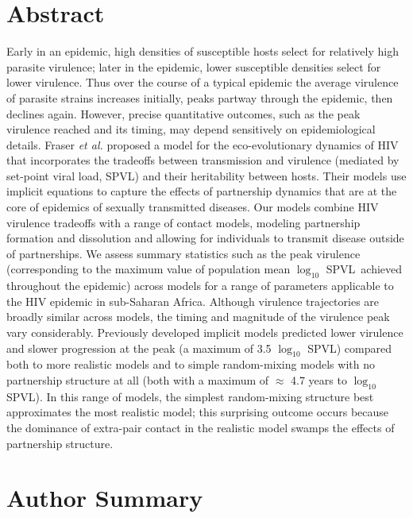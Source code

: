\documentclass[10pt,letterpaper]{article}
\newcommand{\Lspvl}{$\log_{10}$ SPVL}
\begin{document}
\section*{Abstract}
Early in an epidemic, high densities of susceptible hosts
select for relatively high parasite virulence; later in the epidemic,
lower susceptible densities select for lower virulence.
Thus over the course of a typical epidemic the average virulence 
of parasite strains increases initially,
peaks partway through the epidemic, then declines again.
However, precise quantitative outcomes, such as the peak virulence reached
and its timing, may depend sensitively on epidemiological details. 
Fraser \emph{et al.}
proposed a model for the eco-evolutionary
dynamics of HIV that incorporates
the tradeoffs between transmission and virulence (mediated by
set-point viral load, SPVL) and their heritability between
hosts. Their models use implicit equations to
capture the effects of partnership dynamics that are at the core of 
epidemics of sexually transmitted diseases. 
Our models combine HIV virulence tradeoffs with a range of
contact models, modeling partnership formation and
dissolution and allowing for individuals to transmit disease outside
of partnerships. We assess summary statistics such as the peak virulence
(corresponding to the maximum value of population mean \Lspvl\ achieved throughout the epidemic) across
models for a range of 
parameters applicable to the HIV epidemic in sub-Saharan Africa.
Although virulence trajectories are broadly similar
across models, the timing and magnitude of the 
virulence peak vary
considerably.
Previously developed implicit models predicted 
lower virulence and slower progression
at the peak (a maximum of 3.5 \Lspvl) compared both to more realistic models
and to simple random-mixing models with no partnership structure
at all (both with a maximum of $\approx$ 4.7 years to \Lspvl).
In this range of models, the simplest random-mixing structure best
approximates the most realistic model; this
surprising outcome occurs because the dominance of extra-pair
contact in the realistic model swamps the effects of
partnership structure.

\section*{Author Summary}
\end{document}
